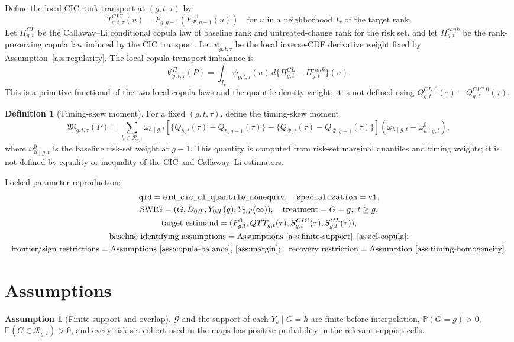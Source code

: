 \documentclass[11pt]{article}
\renewcommand{\Pr}{\mathbb{P}}
\theoremstyle{definition}
\newtheorem{definition}{Definition}
\newtheorem{assumption}{Assumption}
\theoremstyle{plain}
\theoremstyle{remark}
\begin{document}
Define the local CIC rank transport at \((g,t,\tau)\) by
\[
T^{CIC}_{g,t,\tau}(u)=F_{g,g-1}\!\left(F^{-1}_{\mathcal R,g-1}(u)\right)
\quad\text{for }u\text{ in a neighborhood }I_\tau\text{ of the target rank.}
\]
Let \(\Pi^{CL}_{g,t}\) be the Callaway--Li conditional copula law of baseline rank and untreated-change rank for the risk set, and let \(\Pi^{rank}_{g,t}\) be the rank-preserving copula law induced by the CIC transport. Let \(\psi_{g,t,\tau}\) be the local inverse-CDF derivative weight fixed by Assumption~\ref{ass:regularity}. The local copula-transport imbalance is
\[
\mathfrak C^{\Pi}_{g,t,\tau}(P)
  =
  \int_{I_\tau}\psi_{g,t,\tau}(u)\,d\{\Pi^{CL}_{g,t}-\Pi^{rank}_{g,t}\}(u).
\]
This is a primitive functional of the two local copula laws and the quantile-density weight; it is not defined using \(Q^{CL,0}_{g,t}(\tau)-Q^{CIC,0}_{g,t}(\tau)\).

\begin{definition}[Timing-skew moment]\label{def:timing-skew}
For a fixed \((g,t,\tau)\), define the timing-skew moment
\[
\mathfrak M_{g,t,\tau}(P)
  =
  \sum_{h\in\mathcal R_{g,t}}\omega_{h\mid g,t}
  \left[
    \{Q_{h,t}(\tau)-Q_{h,g-1}(\tau)\}
    -
    \{Q_{\mathcal R,t}(\tau)-Q_{\mathcal R,g-1}(\tau)\}
  \right]
  \left(\omega_{h\mid g,t}-\omega^0_{h\mid g,t}\right),
\]
where \(\omega^0_{h\mid g,t}\) is the baseline risk-set weight at \(g-1\). This quantity is computed from risk-set marginal quantiles and timing weights; it is not defined by equality or inequality of the CIC and Callaway--Li estimators.
\end{definition}

Locked-parameter reproduction:
\[
\begin{gathered}
\texttt{qid}=\texttt{eid\_cic\_cl\_quantile\_nonequiv},\quad
\texttt{specialization}=\texttt{v1},\\
\text{SWIG}=(G,D_{0:T},Y_{0:T}(g),Y_{0:T}(\infty)),\quad
\text{treatment}=G=g,\ t\geq g,\\
\text{target estimand}=(F^0_{g,t},QTT_{g,t}(\tau),S^{CIC}_{g,t}(\tau),S^{CL}_{g,t}(\tau)),\\
\text{baseline identifying assumptions}=\text{Assumptions \ref{ass:finite-support}--\ref{ass:cl-copula};}\\
\text{frontier/sign restrictions}=\text{Assumptions \ref{ass:copula-balance}, \ref{ass:margin};}\quad
\text{recovery restriction}=\text{Assumption \ref{ass:timing-homogeneity}.}
\end{gathered}
\]

\section{Assumptions}
\begin{assumption}[Finite support and overlap]\label{ass:finite-support}
\(\mathcal G\) and the support of each \(Y_s\mid G=h\) are finite before interpolation, \(\Pr(G=g)>0\), \(\Pr(G\in\mathcal R_{g,t})>0\), and every risk-set cohort used in the maps has positive probability in the relevant support cells.
\end{assumption}
\end{document}
